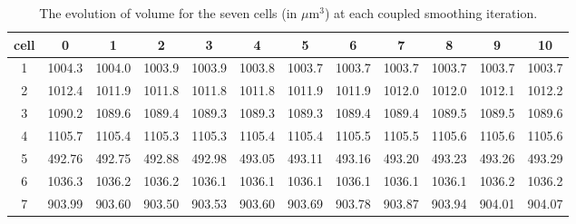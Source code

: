 \documentclass[a4paper,10pt]{article}
\begin{document}
\begin{table}[H]
\begin{center}
\footnotesize
\begin{tabular}{|c|ccccccccccc|}
\hline
cell & 0 &1 &2 &3 &4 &5 &6 &7 &8 &9 &10\\
\hline
1 &1004.3 &1004.0 &1003.9 &1003.9 &1003.8 &1003.7 &1003.7 &1003.7 &1003.7 &1003.7 &1003.7\\
2 &1012.4 &1011.9 &1011.8 &1011.8 &1011.8 &1011.9 &1011.9 &1012.0 &1012.0 &1012.1 &1012.2\\
3 &1090.2 &1089.6 &1089.4 &1089.3 &1089.3 &1089.3 &1089.4 &1089.4 &1089.5 &1089.5 &1089.6\\
4 &1105.7 &1105.4 &1105.3 &1105.3 &1105.4 &1105.4 &1105.5 &1105.5 &1105.6 &1105.6 &1105.6\\
5 &492.76 &492.75 &492.88 &492.98 &493.05 &493.11 &493.16 &493.20 &493.23 &493.26 &493.29\\
6 &1036.3 &1036.2 &1036.2 &1036.1 &1036.1 &1036.1 &1036.1 &1036.1 &1036.1 &1036.2 &1036.2\\
7 &903.99 &903.60 &903.50 &903.53 &903.60 &903.69 &903.78 &903.87 &903.94 &904.01 &904.07\\
\hline
\end{tabular}
\end{center}
\caption{The evolution of volume for the seven cells (in $\mu \text{m}^3$)  at each coupled smoothing iteration.}
\label{tab:vol}
\end{table}
\end{document}
